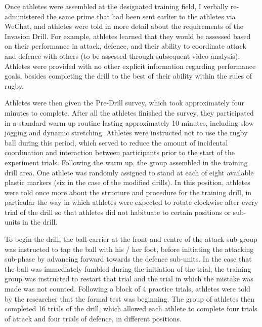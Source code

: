 Once athletes were assembled at the designated training field, I verbally re-administered the same prime that had been sent earlier to the athletes via WeChat, and athletes were told in more detail about the requirements of the Invasion Drill. For example, athletes learned that they would be assessed based on their performance in attack, defence, and their ability to coordinate attack and defence with others (to be assessed through subsequent video analysis).  Athletes were provided with no other explicit information regarding performance goals, besides completing the drill to the best of their ability within the rules of rugby.


Athletes were then given the Pre-Drill survey, which took approximately four minutes to complete.  After all the athletes finished the survey, they participated in a standard warm up routine lasting approximately 10 minutes, including slow jogging and dynamic stretching.  Athletes were instructed not to use the rugby ball during this period, which served to reduce the amount of incidental coordination and interaction between participants prior to the start of the experiment trials.  Following the warm up, the group assembled in the training drill area.  One athlete was randomly assigned to stand at each of eight available plastic markers (six in the case of the modified drills).  In this position, athletes were told once more about the structure and procedure for the training drill, in particular the way in which athletes were expected to rotate clockwise after every trial of the drill so that athletes did not habituate to certain positions or sub-units in the drill.

To begin the drill, the ball-carrier at the front and centre of the attack sub-group was instructed to tap the ball with his / her foot, before initiating the attacking sub-phase by advancing forward towards the defence sub-units.  In the case that the ball was immediately fumbled during the initiation of the trial, the training group was instructed to restart that trial and the trial in which the mistake was made was not counted.  Following a block of 4 practice trials, athletes were told by the researcher that the formal test was beginning.  The group of athletes then completed 16 trials of the drill, which allowed each athlete to complete four trials of attack and four trials of defence, in different positions.


